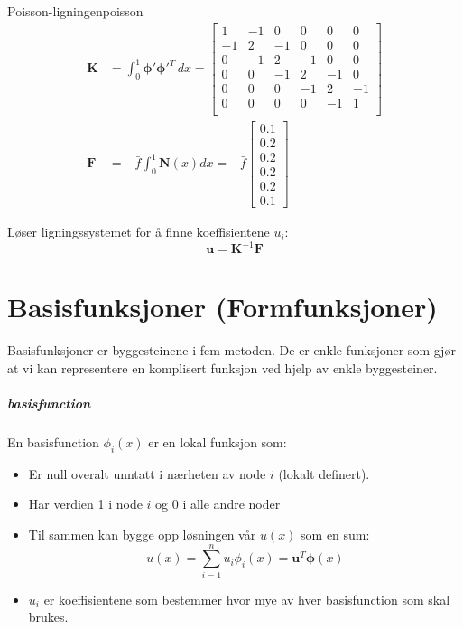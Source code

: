 \begin{example}{Poisson-ligningen}{poisson}
  \begin{align*}
    \symbf{K} & = \int_0^1 \symbf{\phi}' \symbf{\phi}'^T \, dx =
    \begin{bmatrix}
      1  & -1 & 0  & 0  & 0  & 0  \\
      -1 & 2  & -1 & 0  & 0  & 0  \\
      0  & -1 & 2  & -1 & 0  & 0  \\
      0  & 0  & -1 & 2  & -1 & 0  \\
      0  & 0  & 0  & -1 & 2  & -1 \\
      0  & 0  & 0  & 0  & -1 & 1  \\
    \end{bmatrix}                                  \\
    \symbf{F} & = - \bar{f} \int_0^1 \symbf{N}(x) dx
    = - \bar{f}
    \begin{bmatrix}
      0.1 \\ 0.2 \\ 0.2 \\ 0.2 \\ 0.2 \\ 0.1
    \end{bmatrix}
  \end{align*}

  Løser ligningssystemet for å finne koeffisientene \(u_i\):
  \[
    \symbf{u} = \symbf{K}^{-1} \symbf{F}
  \]

\end{example}

\section{Basisfunksjoner (Formfunksjoner)}

Basisfunksjoner er byggesteinene i \gls{fem}-metoden.
De er enkle funksjoner som gjør at vi kan representere en komplisert funksjon ved hjelp av enkle byggesteiner.

\subparagraph{\gls{basisfunction}}
En \gls{basisfunction} $\phi_i(x)$ er en lokal funksjon som:
\begin{itemize}
  \item Er null overalt unntatt i nærheten av node \(i\) (lokalt definert).
  \item Har verdien 1 i node \(i\) og 0 i alle andre noder
  \item Til sammen kan bygge opp løsningen vår \(u(x)\) som en sum:
        \[
          u(x) = \sum_{i=1}^n u_i \phi_i(x) = \symbf{u}^T \symbf{\phi}(x)
        \]
  \item \(u_i\) er koeffisientene som bestemmer hvor mye av hver \gls{basisfunction} som skal brukes.
\end{itemize}


